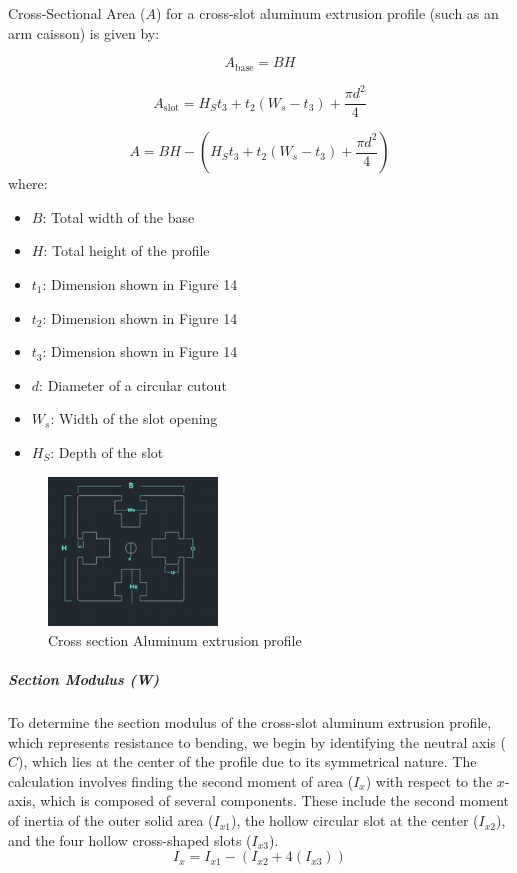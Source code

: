 \documentclass[../../main]{subfiles}
\begin{document}
Cross-Sectional Area ($A$) for a cross-slot aluminum extrusion profile (such as an arm caisson) is given by:

\begin{equation}
    A_{\text{base}} = BH \tag{19}
\end{equation}

\begin{equation}
    A_{\text{slot}} = H_St_3 + t_2\left(W_s - t_3\right) + \frac{\pi d^2}{4} \tag{20}
\end{equation}

\begin{equation}
    A = BH - \left(H_St_3 + t_2\left(W_s - t_3\right) + \frac{\pi d^2}{4}\right) \tag{21}
\end{equation}
where:

\begin{itemize}
    \item $B$: Total width of the base
    \item $H$: Total height of the profile
    \item $t_1$: Dimension shown in Figure 14
    \item $t_2$: Dimension shown in Figure 14
    \item $t_3$: Dimension shown in Figure 14
    \item $d$: Diameter of a circular cutout
    \item $W_s$: Width of the slot opening
    \item $H_S$: Depth of the slot
\end{itemize}


\begin{figure}[h!]
  \centering
  \includegraphics[width=0.4\textwidth]{img/n3.png}
  \caption{Cross section Aluminum extrusion profile}
\end{figure}
\newpage

\subparagraph{Section Modulus (W)}
To determine the section modulus of the cross-slot aluminum extrusion profile, which represents resistance to bending, we begin by identifying the neutral axis ($C$), which lies at the center of the profile due to its symmetrical nature. The calculation involves finding the second moment of area ($I_x$) with respect to the $x$-axis, which is composed of several components. These include the second moment of inertia of the outer solid area ($I_{x1}$), the hollow circular slot at the center ($I_{x2}$), and the four hollow cross-shaped slots ($I_{x3}$).
\begin{equation}
  I_x = I_{x1} - \left(I_{x2} + 4(I_{x3})\right)
\end{equation}
\end{document}
